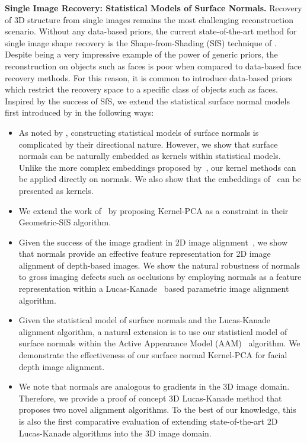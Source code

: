 \textbf{Single Image Recovery: Statistical Models of Surface Normals.} Recovery
of 3D structure from single images remains the most challenging reconstruction
scenario. Without any data-based priors, the current state-of-the-art method
for single image shape recovery is the Shape-from-Shading (SfS) technique
of \citet{barron2015shape}. Despite being a very impressive example of the power
of generic priors, the reconstruction on objects such as faces is poor when 
compared to data-based face recovery methods. For this reason, it is common
to introduce data-based priors which restrict the recovery space to a specific
class of objects such as faces. Inspired by the success of SfS, we extend
the statistical surface normal models first introduced by 
\citet{smith2006recovering,smith2008facial} in the following ways:
\begin{itemize}
	\item As noted by \citet{smith2006recovering,smith2008facial}, constructing
		  statistical models of surface normals is complicated by their
		  directional nature. However, we show that surface normals can be 
		  naturally embedded as kernels within statistical models. Unlike
		  the more complex embeddings proposed by~\cite{smith2006recovering,smith2008facial}, 
		  our kernel methods can be applied directly on normals. We also show
		  that the embeddings of~\cite{smith2006recovering,smith2008facial} 
		  can be presented as kernels.
    \item We extend the work of~\cite{smith2006recovering,smith2008facial}
          by proposing Kernel-PCA as a constraint in their Geometric-SfS 
          algorithm.
    \item Given the success of the image gradient in 2D image alignment~\cite{tzimiropoulos2011robust,cootes2001representing},
          we show that normals provide an effective feature representation
          for 2D image alignment of depth-based images. We show the natural
          robustness of normals to gross imaging defects such as occlusions
          by employing normals as a feature representation within a 
          Lucas-Kanade~\cite{lucas1981iterative,baker2004lucas}
          based parametric image alignment algorithm.
    \item Given the statistical model of surface normals and the Lucas-Kanade
          alignment algorithm, a natural extension is to use our statistical
          model of surface normals within the Active Appearance Model (AAM)~\cite{cootes2001active,matthews2004active} 
          algorithm. We demonstrate the effectiveness of our surface normal 
          Kernel-PCA for facial depth image alignment.
    \item We note that normals are analogous to gradients in the 3D image 
          domain. Therefore, we provide a proof of concept 3D Lucas-Kanade
          method that proposes two novel alignment algorithms. To the best of
          our knowledge, this is also the first comparative evaluation of
          extending state-of-the-art 2D Lucas-Kanade algorithms into the 3D
          image domain.
\end{itemize}

